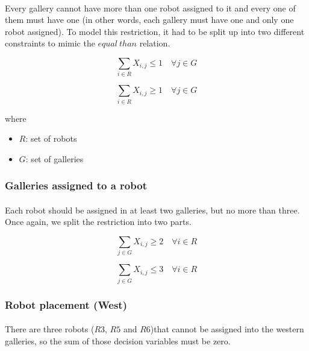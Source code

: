 \paragraph{}
Every gallery cannot have more than one robot assigned to it and every one of them must have one (in other words, each gallery must have one and only one robot assigned). To model this restriction, it had to be split up into two different constraints to mimic the $equal\ than$ relation.

\begin{equation}
    \sum_{i \in R}X_{i,j} \leq 1 \quad \forall j \in G
\end{equation}

\begin{equation}
    \sum_{i \in R}X_{i,j} \geq 1 \quad \forall j \in G
\end{equation}

where

\begin{itemize}
    \item[] $R$: set of robots
    \item[] $G$: set of galleries
\end{itemize}


\subsubsection{Galleries assigned to a robot}

\paragraph{}
Each robot should be assigned in at least two galleries, but no more than three. Once again, we split the restriction into two parts.

\begin{equation}
    \sum_{j \in G}X_{i,j} \geq 2 \quad \forall i \in R
\end{equation}

\begin{equation}
    \sum_{j \in G}X_{i,j} \leq 3 \quad \forall i \in R
\end{equation}




\subsubsection{Robot placement (West)}

\paragraph{}
There are three robots ($R3$, $R5$ and $R6$)that cannot be assigned into the western galleries, so the sum of those decision variables must be zero.

